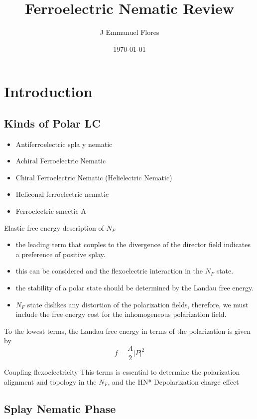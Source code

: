 \documentclass{article}
\title{Ferroelectric Nematic Review}
\author{J Emmanuel Flores}
\date{\today}
\begin{document}
\maketitle

\section{Introduction}
\subsection{Kinds of Polar LC \cite{Zou2024extended}}
\begin{itemize}
    \item Antiferroelectric spla	y nematic
    \item Achiral Ferroelectric Nematic
    \item Chiral Ferroelectric Nematic (Helielectric Nematic)
    \item Heliconal ferroelectric nematic
    \item Ferroelectric smectic-A
\end{itemize}
Elastic free energy description of $N_{F}$
\begin{itemize}
    \item the leading term that couples to the divergence of the director field indicates a preference of positive splay.
    \item this can be considered and the flexoelectric interaction in the $N_{F}$ state.
    \item the stability of  a polar state should be determined by the Landau free energy.
    \item $N_{F}$ state dislikes any distortion of the polarization fields, therefore, we must include the free energy cost for the inhomogeneous polarization field.
\end{itemize}
To the lowest terms, the Landau free energy in terms of the polarization is given by 
\begin{equation}
    f=\frac{A}{2}|P|^2
\end{equation}

Coupling flexoelectricity
This terms is essential to determine the polarization alignment and topology in the $N_{F}$, and the HN*
Depolarization charge effect

\subsection{Splay Nematic Phase\cite{Mertelj2018splay}}
\end{document}
